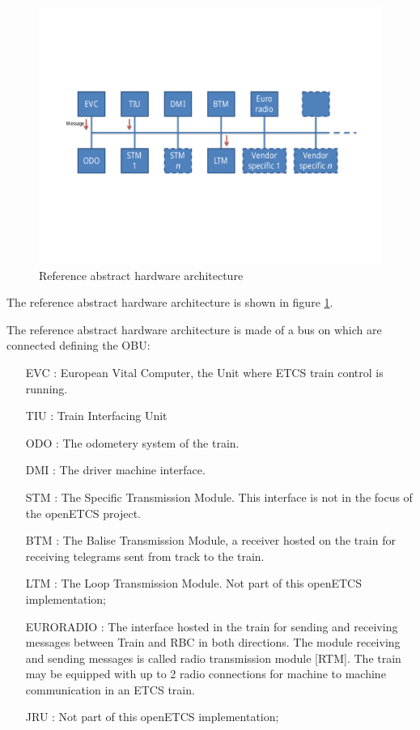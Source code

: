 \documentclass{template/openetcs_report}
\begin{document}
\begin{figure}
  \centering
  \includegraphics[width=\linewidth]{abstract-hardware-architecture.pdf}
  \caption{Reference abstract hardware architecture}
  \label{fig:hardware-arch}
\end{figure}

The reference abstract hardware architecture is shown in figure
\ref{fig:hardware-arch}.

The reference abstract hardware architecture is made of a bus on which
are connected  defining the OBU:

\begin{itemize}
\item[EVC] : European Vital Computer, the Unit where ETCS train control is running.
\item[TIU] : Train Interfacing Unit
\item[ODO] : The odometery system of the train.
\item[DMI] : The driver machine interface.
\item[STM] : The Specific Transmission Module. This interface is not in the focus of the openETCS project.
\item[BTM] : The Balise Transmission Module, a receiver hosted on the train for  receiving telegrams sent from track to the train. 
\item[LTM] : The Loop Transmission Module. Not part of this openETCS implementation;
\item[EURORADIO] : The interface hosted in the train for sending and receiving messages between Train and RBC in both directions. The module receiving and sending  messages is called radio transmission module [RTM]. The train may be equipped with up to 2 radio connections for machine to machine communication in an ETCS train. 
\item[JRU]: Not part of this openETCS implementation;
\end{itemize}
\end{document}

